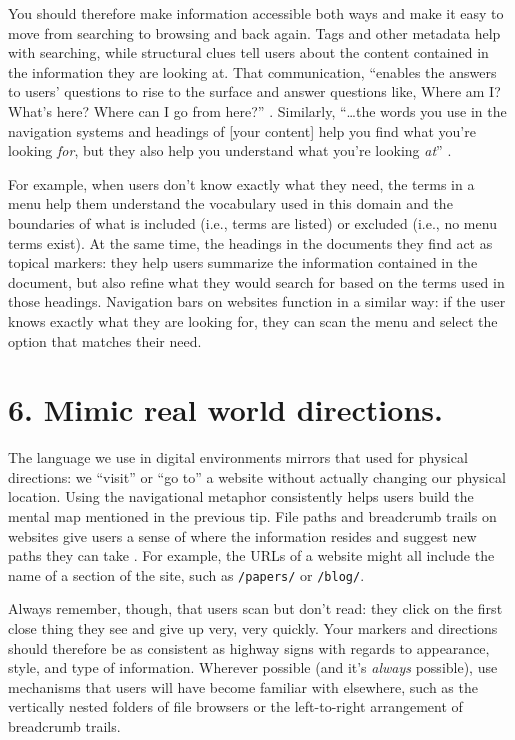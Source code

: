 \documentclass[10pt,letterpaper]{article}
\newcommand{\rulemajor}[1]{\section*{#1}}
\begin{document}
You should therefore make information accessible both ways and make it easy to
move from searching to browsing and back again. Tags and other metadata help
with searching, while structural clues tell users about the content contained in
the information they are looking at. That communication, ``enables the answers
to users' questions to rise to the surface and answer questions like, Where am
I? What's here? Where can I go from here?''  \cite{Rosenfeld2015}. Similarly,
``{\ldots}the words you use in the navigation systems and headings of [your
  content] help you find what you're looking \emph{for}, but they also help you
understand what you're looking \emph{at}'' \cite{Arango2018}.

For example, when users don't know exactly what they need, the terms in a menu
help them understand the vocabulary used in this domain and the boundaries of
what is included (i.e., terms are listed) or excluded (i.e., no menu terms
exist). At the same time, the headings in the documents they find act as topical
markers: they help users summarize the information contained in the document,
but also refine what they would search for based on the terms used in those
headings. Navigation bars on websites function in a similar way: if the user
knows exactly what they are looking for, they can scan the menu and select the
option that matches their need.

\rulemajor{6. Mimic real world directions.}

The language we use in digital environments mirrors that used for physical
directions: we ``visit'' or ``go to'' a website without actually changing our
physical location. Using the navigational metaphor consistently helps users
build the mental map mentioned in the previous tip. File paths and breadcrumb
trails on websites give users a sense of where the information resides and
suggest new paths they can take \cite{Krug2014}. For example, the URLs of a
website might all include the name of a section of the site, such as
\texttt{/papers/} or \texttt{/blog/}.

Always remember, though, that users scan but don't read: they click on the first
close thing they see and give up very, very quickly. Your markers and directions
should therefore be as consistent as highway signs with regards to appearance,
style, and type of information. Wherever possible (and it's \emph{always}
possible), use mechanisms that users will have become familiar with elsewhere,
such as the vertically nested folders of file browsers or the left-to-right
arrangement of breadcrumb trails.
\end{document}
